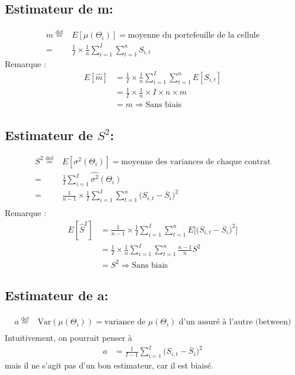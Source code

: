 \documentclass[11pt,french]{report}
\begin{document}
\subsection{Estimateur de m:}
\begin{align*}
m \overset{\text{def}}{=}& E[\mu(\Theta_i)] = \text{moyenne du portefeuille de la cellule} \\
=& \frac{1}{I} \times \frac{1}{n} \sum_{i=1}^{I} \sum_{t=1}^{n} S_{i,t}
\end{align*}
Remarque :
\begin{align*}
E[\widehat{m}] &= \frac{1}{I} \times \frac{1}{n} \sum_{i=1}^{I} \sum_{t=1}^{n} E[S_{i,t}] \\
&= \frac{1}{I} \times \frac{1}{n} \times I \times n \times m \\
&= m \Rightarrow \text{Sans biais}
\end{align*}

\subsection{Estimateur de $S^2$:}
\begin{align*}
S^2 \overset{\text{def}}{=}& E[\sigma^2(\Theta_i)] = \text{moyenne des variances de chaque contrat} \\
=& \frac{1}{I}  \sum_{i=1}^{I} \widehat{\sigma^2}(\Theta_i) \\
=& \frac{1}{n-1} \times  \frac{1}{I}  \sum_{i=1}^{I} \sum_{t=1}^{n} \big( S_{i,t} -\overline{S}_i \big)^2 \\
\end{align*}
Remarque :
\begin{align*}
E[\widehat{S}^2] &= \frac{1}{n-1} \times  \frac{1}{I}  \sum_{i=1}^{I} \sum_{t=1}^{n} E \Big[   \big( S_{i,t} -\overline{S}_i \big)^2 \Big]\\
&= \frac{1}{I} \times \frac{1}{n}  \sum_{i=1}^{I} \sum_{t=1}^{n} \frac{n-1}{n} S^2 \\
&= S^2 \Rightarrow \text{Sans biais}
\end{align*}

\subsection{Estimateur de a:}
\begin{align*}
a \overset{\text{def}}{=}& \text{Var}(\mu(\Theta_i)) = \text{variance de $\mu(\Theta_i)$ d'un assuré à l'autre (between)} \\
\end{align*}
Intuitivement, on pourrait penser à
\begin{align*}
\widehat{a} &= \frac{1}{I-1} \sum_{i=1}^{I} \big( S_{i,t} -\overline{S}_i \big)^2
\end{align*}
mais il ne s'agit pas d'un bon estimateur, car il est biaisé.
\end{document}

